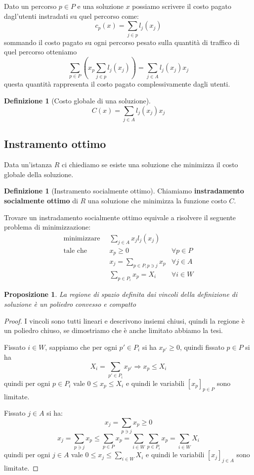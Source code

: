 \documentclass[a4paper]{article}
\newcounter{counter1}
\theoremstyle{plain}
\newtheorem{mypro}[counter1]{Proposizione}
\theoremstyle{definition}
\newtheorem{mydef}[counter1]{Definizione}
\theoremstyle{remark}
\newcommand{\pa}[1]{\left(#1\right)}
\newcommand{\bra}[1]{\left[#1\right]}
\begin{document}
Dato un percorso $p\in P$ e una soluzione $x$ possiamo scrivere il
costo pagato dagl'utenti instradati su quel percorso come:
\[ c_p\pa{x} = \sum _{j\in p} l_j\pa{x_j} \]
sommando il costo pagato su ogni percorso pesato sulla quantit\`a di
traffico di quel percorso otteniamo
\[ \sum _{p\in P} \pa{ x_p \sum _{j\in p} l_j\pa{x_j}}  = \sum _{j\in
    A} l_j\pa{x_j}x_j \]
questa quantit\`a rappresenta il costo pagato complessivamente dagli utenti.

\begin{mydef}[Costo globale di una soluzione]
  \[ C\pa{x} = \sum _{j\in A} l_j\pa{x_j}x_j \]  
\end{mydef}

\subsection{Instramento ottimo}
\label{sec:instramento-ottimo}

Data un'istanza $R$ ci chiediamo se esiste una soluzione che minimizza
il costo globale della soluzione.

\begin{mydef}[Instramento socialmente ottimo]
  Chiamiamo \textbf{instradamento socialmente ottimo} di $R$ una
  soluzione che minimizza la funzione costo $C$. 
\end{mydef}

Trovare un instradamento socialmente ottimo equivale a risolvere il
seguente problema di minimizzazione:
\begin{align*}
      \text{minimizzare}\;\; & \sum _{j\in A} x_j l_j(x_j) \\
      \text{tale che}\;\; &   x_p \ge 0 & \forall p\in P \\
      & x_j = \sum_{p\in P,p\ni j} x_p & \forall j\in A \\
      &\sum_{p\in P_i} x_p = X_i & \forall i\in W
\end{align*}

\begin{mypro}
  La regione di spazio definita dai vincoli della definizione di
  soluzione \`e un poliedro convesso e compatto
\end{mypro}
\begin{proof}
  I vincoli sono tutti lineari e descrivono insiemi chiusi, quindi la
  regione \`e un poliedro chiuso, se dimostriamo che \`e anche
  limitato abbiamo la tesi.

  Fissato $i\in W$, sappiamo che per ogni $p'\in P_i$ si ha $x_{p'} \ge
  0$, quindi fissato $p\in P$ si ha
  \[ X_i = \sum _{p'\in P_i} x_{p'} \Rightarrow x_p \le X_i \]
  quindi per ogni $p\in P_i$ vale $0\le x_p \le X_i$ e quindi le
  variabili $\bra{x_p}_{p\in P}$ sono limitate.

  Fissato $j\in A$ si ha:
  \[ x_j = \sum _{p\ni j} x_p \ge 0 \]
  \[ x_j = \sum _{p\ni j} x_p \le \sum _{p\in P} x_p = \sum _{i\in W}
    \sum _{p\in P_i} x_p = \sum _{i\in W} X_i \]
  quindi per ogni $j\in A$ vale $0\le x_j \le \sum _{i\in W} X_i$ e
  quindi le variabili $\bra{x_j}_{j\in A}$ sono limitate.
\end{proof}
\end{document}
